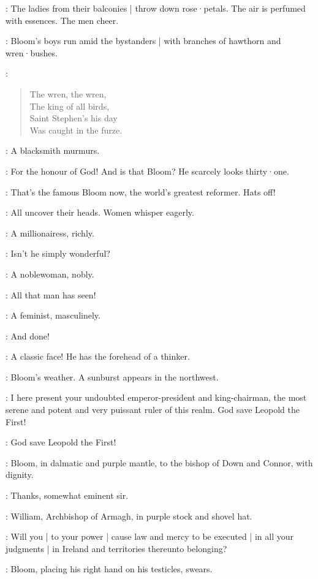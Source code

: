 :
The ladies from their balconies |
throw down rose·petals.
The air is perfumed with essences.
The men cheer.

:
Bloom's boys run amid the bystanders |
with branches of hawthorn and wren·bushes.

\BloomsBoys:
\begin{verse}
    The wren, the wren,\\
    The king of all birds,\\
    Saint Stephen's his day\\
    Was caught in the furze.
\end{verse}

:
A blacksmith murmurs.

\Blacksmith:
For the honour of God!
And is that Bloom?
He scarcely looks thirty·one.

\Flagger[1]:
That's the famous Bloom now,
the world's greatest reformer.
Hats off!

:
All uncover their heads.
Women whisper eagerly.

:
A millionairess,
richly.

\Millionairess:
Isn't he simply wonderful?

:
A noblewoman,
nobly.

\Noblewoman:
All that man has seen!

:
A feminist,
masculinely.

\Feminist:
And done!

\Bellhanger[2]:
A classic face!
He has the forehead of a thinker.

:
Bloom's weather.
A sunburst appears in the northwest.

\DownConnor[2]:
I here present your undoubted emperor-president and king-chairman,
the most serene and potent and very puissant ruler of this realm.
God save Leopold the First!

\All:
God save Leopold the First!

:
Bloom,
in dalmatic and purple mantle,
to the bishop of Down and Connor,
with dignity.

\Bloom:
Thanks,
somewhat eminent sir.

:
William,
Archbishop of Armagh,
in purple stock and shovel hat.

\WillArmagh:
Will you |
to your power |
cause law and mercy to be executed |
in all your judgments |
in Ireland and territories thereunto belonging?

:
Bloom,
placing his right hand on his testicles,
swears.

